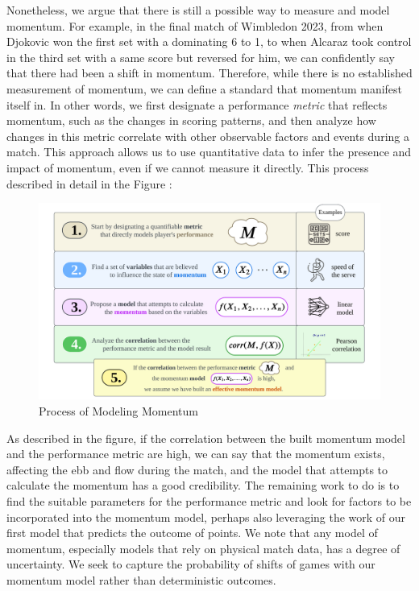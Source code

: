 \documentclass[12pt]{article}  %
\begin{document}
Nonetheless, we argue that there is still a possible way to measure and model momentum. For example, in the final match of Wimbledon 2023, from when Djokovic won the first set with a dominating 6 to 1, to when Alcaraz took control in the third set with a same score but reversed for him, we can confidently say that there had been a shift in momentum. Therefore, while there is no established measurement of momentum, we can define a standard that momentum manifest itself in. In other words, we first designate a performance \textit{metric} that reflects momentum, such as the changes in scoring patterns, and then analyze how changes in this metric correlate with other observable factors and events during a match. This approach allows us to use quantitative data to infer the presence and impact of momentum, even if we cannot measure it directly. This process described in detail in the Figure :

\begin{figure}[htbp]  %
	\centering  %
	\includegraphics[width=\textwidth]{momentum-model.png} %
	\caption{\centering Process of Modeling Momentum} %
\end{figure}

As described in the figure, if the correlation between the built momentum model and the performance metric are high, we can say that the momentum exists, affecting the ebb and flow during the match, and the model that attempts to calculate the momentum has a good credibility. The remaining work to do is to find the suitable parameters for the performance metric and look for factors to be incorporated into the momentum model, perhaps also leveraging the work of our first model that predicts the outcome of points. We note that any model of momentum, especially models that rely on physical match data, has a degree of uncertainty. We seek to capture the probability of shifts of games with our momentum model rather than deterministic outcomes.
\end{document}
